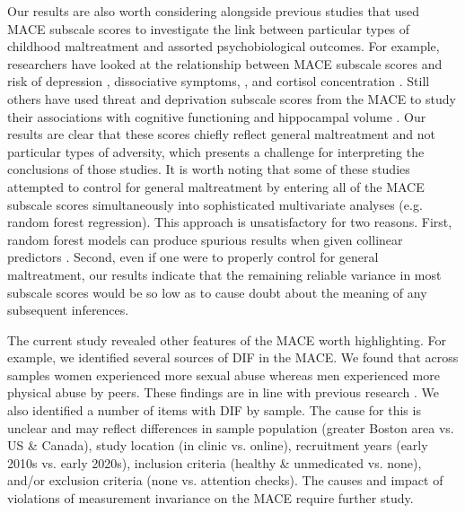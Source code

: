 \documentclass[letterpaper,man,natbib,noextraspace,floatsintext,longtable,12pt]{apa6}
\begin{document}
Our results are also worth considering alongside previous studies that used MACE subscale scores to investigate the link between particular types of childhood maltreatment and assorted psychobiological outcomes. For example, researchers have looked at the relationship between MACE subscale scores and risk of depression \citep{gerke2018childhood}, dissociative symptoms, \citep{schalinski2015type}, and cortisol concentration \citep{schalinski2019early}. Still others have used threat and deprivation subscale scores from the MACE to study their associations with cognitive functioning \citep{schalinski2018defining} and hippocampal volume \citep{teicher2018differential}. Our results are clear that these scores chiefly reflect general maltreatment and not particular types of adversity, which presents a challenge for interpreting the conclusions of those studies. It is worth noting that some of these studies attempted to control for general maltreatment by entering all of the MACE subscale scores simultaneously into sophisticated multivariate analyses (e.g. random forest regression). This approach is unsatisfactory for two reasons. First, random forest models can produce spurious results when given collinear predictors \citep{gregorutti2017correlation}. Second, even if one were to properly control for general maltreatment, our results indicate that the remaining reliable variance in most subscale scores would be so low as to cause doubt about the meaning of any subsequent inferences.

The current study revealed other features of the MACE worth highlighting. For example, we identified several sources of DIF in the MACE. We found that across samples women experienced more sexual abuse whereas men experienced more physical abuse by peers. These findings are in line with previous research \citep{radford2013prevalence}. We also identified a number of items with DIF by sample. The cause for this is unclear and may reflect differences in sample population (greater Boston area vs. US \& Canada), study location (in clinic vs. online), recruitment years (early 2010s vs. early 2020s), inclusion criteria (healthy \& unmedicated vs. none), and/or exclusion criteria (none vs. attention checks). The causes and impact of violations of measurement invariance on the MACE require further study. 
\end{document}
